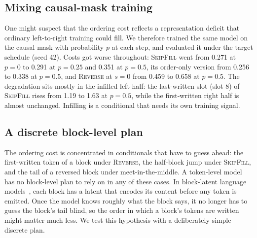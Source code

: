 \documentclass{article}
\theoremstyle{definition}
\theoremstyle{remark}
\newcommand{\name}[1]{\textup{\textsc{#1}}}
\newcommand{\sfill}{\name{SkipFill}\xspace}
\newcommand{\rev}{\name{Reverse}\xspace}
\begin{document}
\subsection{Mixing causal-mask training}
\label{app:mixing}

One might suspect that the ordering cost reflects a representation deficit that ordinary left-to-right training could fill.
We therefore trained the same model on the causal mask with probability $p$ at each step, and evaluated it under the target schedule (seed 42).
Costs got worse throughout: \sfill went from 0.271 at $p=0$ to 0.291 at $p=0.25$ and 0.351 at $p=0.5$, its order-only version from 0.256 to 0.338 at $p=0.5$, and \rev at $s=0$ from 0.459 to 0.658 at $p=0.5$.
The degradation sits mostly in the infilled left half: the last-written slot (slot 8) of \sfill rises from 1.19 to 1.63 at $p=0.5$, while the first-written right half is almost unchanged.
Infilling is a conditional that needs its own training signal.

\subsection{A discrete block-level plan}
\label{sec:latent}

The ordering cost is concentrated in conditionals that have to guess ahead: the first-written token of a block under \rev, the half-block jump under \sfill, and the tail of a reversed block under meet-in-the-middle.
A token-level model has no block-level plan to rely on in any of these cases.
In block-latent language models~\citep{shao2025calm,he2026psf,li2026lclm}, each block has a latent that encodes its content before any token is emitted.
Once the model knows roughly what the block says, it no longer has to guess the block's tail blind, so the order in which a block's tokens are written might matter much less.
We test this hypothesis with a deliberately simple discrete plan.
\end{document}
